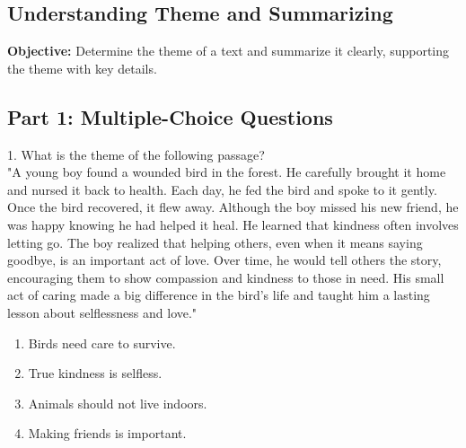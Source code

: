 \documentclass[12pt]{article}
\begin{document}
\subsection*{Understanding Theme and Summarizing}
\onehalfspacing

\begin{tcolorbox}[colframe=black!40, colback=gray!0, title=Learning Objective]
\textbf{Objective:} Determine the theme of a text and summarize it clearly, supporting the theme with key details.
\end{tcolorbox}

\subsection*{Part 1: Multiple-Choice Questions}

1. What is the theme of the following passage?\\
"A young boy found a wounded bird in the forest. He carefully brought it home and nursed it back to health. Each day, he fed the bird and spoke to it gently. Once the bird recovered, it flew away. Although the boy missed his new friend, he was happy knowing he had helped it heal. He learned that kindness often involves letting go. The boy realized that helping others, even when it means saying goodbye, is an important act of love. Over time, he would tell others the story, encouraging them to show compassion and kindness to those in need. His small act of caring made a big difference in the bird’s life and taught him a lasting lesson about selflessness and love."\\
\begin{enumerate}[label=\Alph*.]
    \item Birds need care to survive.  
    \item True kindness is selfless.  
    \item Animals should not live indoors.  
    \item Making friends is important.  
\end{enumerate}
\end{document}
